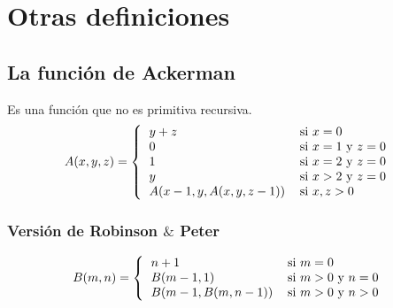%

\section{Otras definiciones}
\subsection{La función de Ackerman}
Es una función que no es primitiva recursiva.
\begin{align*}
	A(x,y,z) = \left\{
	\begin{tabular}{ll}
		$y + z$ & si $x=0$ \\
		$0$ & si $x = 1$ y $z = 0$ \\
		$1$ & si $x = 2$ y $z = 0$ \\
		$y$ & si $x > 2$ y $z = 0$ \\
		$A(x-1, y, A(x,y,z-1))$ & si $x,z > 0$
	\end{tabular}
	\right.
\end{align*}

\subsubsection{Versión de Robinson $\&$ Peter}
\begin{align*}
B(m,n) = \left\{
\begin{tabular}{ll}
$n + 1$ & si $m=0$ \\
$B(m-1,1)$ & si $m > 0$ y $n = 0$ \\
$B(m-1,B(m,n-1))$ & si $m > 0$ y $n > 0$ \\
\end{tabular}
\right.
\end{align*}
